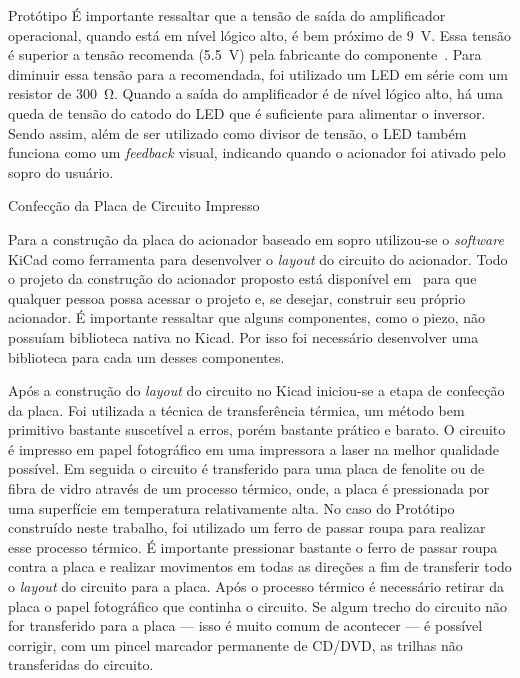 \begin{chapter}{Protótipo}
 É importante ressaltar que a tensão de saída do amplificador
operacional, quando está em nível lógico alto, é bem próximo de 9~V. Essa tensão
é superior a tensão recomenda (5.5~V) pela fabricante do componente~\cite{7404}. 
Para diminuir essa tensão para a recomendada, foi utilizado um LED em série com
um resistor de 300~\si{\ohm}. Quando a saída do amplificador é de nível lógico
alto, há uma queda de tensão do catodo do LED que é suficiente para alimentar o
inversor. Sendo assim, além de ser utilizado como divisor de tensão, o LED
também funciona como um \textit{feedback} visual, indicando quando o acionador
foi ativado pelo sopro do usuário.  


\begin{section}{Confecção da Placa de Circuito Impresso}

Para a construção da placa do acionador baseado em sopro utilizou-se o
\textit{software} KiCad como ferramenta para desenvolver o \textit{layout} do
circuito do acionador. Todo o projeto da construção do acionador proposto está
disponível em~\cite{ErickGit} para que qualquer pessoa possa acessar o projeto
e, se desejar, construir seu próprio acionador. É importante ressaltar que
alguns componentes, como o piezo, não possuíam biblioteca nativa no Kicad. Por
isso foi necessário desenvolver uma biblioteca para cada um desses componentes.

Após a construção do \textit{layout} do circuito no Kicad iniciou-se a
etapa de confecção da placa. Foi utilizada a técnica de transferência térmica,
um método bem primitivo bastante suscetível a erros, porém bastante prático e
barato. O circuito é impresso em papel fotográfico em uma impressora a laser na
melhor qualidade possível. Em seguida o circuito é transferido para uma placa de
fenolite ou de fibra de vidro através de um processo térmico, onde, a placa é
pressionada por uma superfície em temperatura relativamente alta. No caso do
Protótipo construído neste trabalho, foi utilizado um ferro de passar roupa para
realizar esse processo térmico. É importante pressionar bastante o ferro de
passar roupa contra a placa e realizar movimentos em todas as direções a fim 
de transferir todo o \textit{layout} do circuito para a placa. Após o processo
térmico é necessário retirar da placa o papel fotográfico que continha o 
circuito. Se algum trecho do circuito não for transferido para a placa --- isso
é muito comum de acontecer --- é possível corrigir, com um pincel
marcador permanente de CD/DVD, as trilhas não transferidas do circuito.  


\end{section}
\end{chapter}
